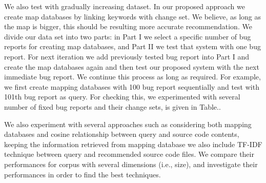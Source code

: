 \documentclass{sig-alternate}
\begin{document}
We also test with gradually increasing dataset. In our proposed approach we create map databases by linking keywords with change set. We believe, as long as the map is bigger, this should be resulting more accurate recommendation. 
We divide our data set into two parts: in Part I we select a specific number of bug reports for creating map databases, and Part II we test that system with one bug report. For next iteration we add previously tested bug report into Part I and create the map databases again and then test our proposed system with the next immediate bug report. We continue this process as long as required. For example, we first create mapping databases with 100 bug report sequentially and test with 101th bug report as query.
For checking this, we experimented with several number of fixed bug reports and their change sets, is given in Table..
\begin{table}[!t]
\caption{The Performance 10 for different size of datasets.}
\label{tab:size}
\centering
{}
\end{table}

We also experiment with several approaches such as considering both mapping databases and cosine relationship between query and source code contents, keeping the information retrieved from mapping database we also include TF-IDF technique between query and recommended source code files. We compare their performances for corpus with several dimensions (i.e., size), and investigate their performances in order to find the best techniques.
\end{document}
